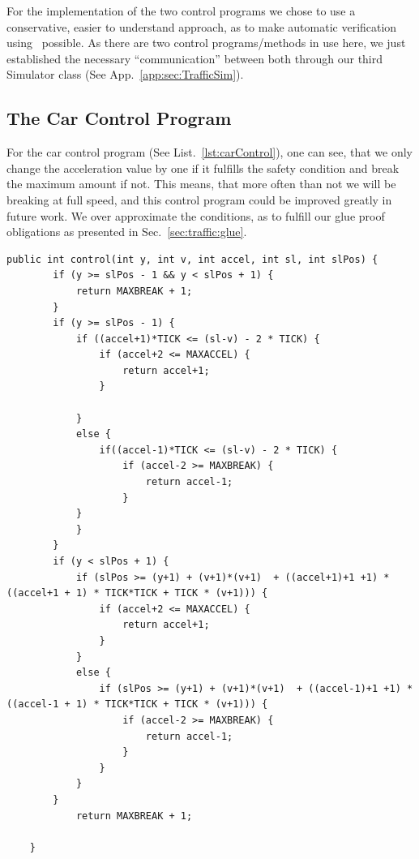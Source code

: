 For the implementation of the two control programs we chose to use a conservative, easier to understand approach, as to make automatic verification using \key~possible. As there are two control programs/methods in use here, we just established the necessary ``communication'' between both through our third Simulator class (See App.~\ref{app:sec:TrafficSim}). 

\subsection{The Car Control Program}
\label{subsec:traffic:car}
For the car control program (See List.~\ref{lst:carControl}), one can see, that we only change the acceleration value by one if it fulfills the safety condition and break the maximum amount if not. This means, that more often than not we will be breaking at full speed,  and this control program could be improved greatly in future work. We over approximate the conditions, as to fulfill our glue proof obligations as presented in Sec.~\ref{sec:traffic:glue}.

\begin{lstlisting}[label=lst:carControl]
public int control(int y, int v, int accel, int sl, int slPos) {
		if (y >= slPos - 1 && y < slPos + 1) {
			return MAXBREAK + 1;
		}
		if (y >= slPos - 1) {
			if ((accel+1)*TICK <= (sl-v) - 2 * TICK) {
				if (accel+2 <= MAXACCEL) {
					return accel+1;
				}
				
			}
			else {
				if((accel-1)*TICK <= (sl-v) - 2 * TICK) {
					if (accel-2 >= MAXBREAK) {
						return accel-1;
					}
			}
			}
		}
		if (y < slPos + 1) {
			if (slPos >= (y+1) + (v+1)*(v+1)  + ((accel+1)+1 +1) * ((accel+1 + 1) * TICK*TICK + TICK * (v+1))) {
				if (accel+2 <= MAXACCEL) {
					return accel+1;
				}
			}
			else {
				if (slPos >= (y+1) + (v+1)*(v+1)  + ((accel-1)+1 +1) * ((accel-1 + 1) * TICK*TICK + TICK * (v+1))) {
					if (accel-2 >= MAXBREAK) {
						return accel-1;
					}
				}
			}
		}
			return MAXBREAK + 1;
		
	}
\end{lstlisting}

